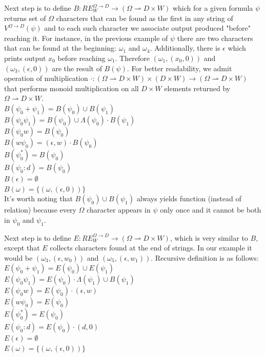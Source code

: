 Next step is to define $B:RE_W^{\Omega\rightarrow D} \rightarrow (\Omega \rightharpoonup D \times W)$ which for a given formula $\psi$ returns set of $\Omega$ characters that can be found as the first in any string of $V^{\Omega\rightarrow D}(\psi)$ and to each such character we associate output produced "before" reaching it. For instance, in the previous example of $\psi$ there are two characters that can be found at the beginning: $\omega_1$ and $\omega_4$. Additionally, there is $\epsilon$ which prints output $x_0$ before reaching $\omega_1$. Therefore $(\omega_1,(x_0,0))$ and $(\omega_3,(\epsilon,0))$ are the result of $B(\psi)$. For better readability, we admit operation of multiplication $\cdot : (\Omega \rightharpoonup D \times W) \times (D \times W) \rightarrow (\Omega \rightharpoonup D \times W)$ that performs monoid multiplication on all $D \times W$ elements returned by $\Omega \rightharpoonup D \times W$. \\
$B(\psi_0 + \psi_1) = B(\psi_0)\cup B(\psi_1) $ \\
$B(\psi_0 \psi_1) = B(\psi_0) \cup \Lambda(\psi_0)\cdot B(\psi_1)$ \\
$B(\psi_0 w) = B(\psi_0)$ \\
$B(w \psi_0 ) = (\epsilon,w)\cdot B(\psi_0)$ \\
$B(\psi_0^*) =  B(\psi_0)$ \\
$B(\psi_0 : d) =  B(\psi_0)$ \\
$B(\epsilon) =  \emptyset$ \\
$B(\omega) =  \{(\omega,(\epsilon,0)) \}$ \\
It's worth noting that $B(\psi_0)\cup B(\psi_1)$ always yields function  (instead of relation) because every $\Omega$ character appears in $\psi$ only once and it cannot be both in $\psi_0$ and $\psi_1$. 

Next step is to define $E:RE_W^{\Omega\rightarrow D} \rightarrow (\Omega \rightharpoonup D \times W)$, which is very similar to $B$, except that $E$ collects characters found at the end of strings. In our example it would be $(\omega_3,(\epsilon,w_0))$ and $(\omega_5,(\epsilon,w_1))$. Recursive definition is as follows:\\ 
$E(\psi_0 + \psi_1) = E(\psi_0)\cup E(\psi_1) $ \\
$E(\psi_0 \psi_1) = E(\psi_0) \cdot \Lambda(\psi_1) \cup  B(\psi_1)$ \\
$E(\psi_0 w) = E(\psi_0) \cdot (\epsilon,w) $ \\
$E(w \psi_0 ) = E(\psi_0)$ \\
$E(\psi_0 ^*) =  E(\psi_0) $ \\
$E(\psi_0 : d) =  E(\psi_0) \cdot (d,0)$ \\
$E(\epsilon) =  \emptyset$ \\
$E(\omega) =  \{(\omega,(\epsilon,0)) \}$ 

